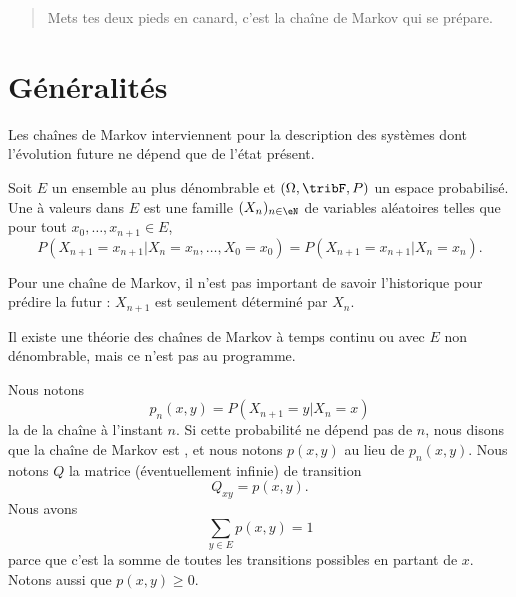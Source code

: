 
\begin{quote}
    Mets tes deux pieds en canard, c'est la chaîne de Markov qui se prépare.
\end{quote}

\section{Généralités}

Les chaînes de Markov interviennent pour la description des systèmes dont l'évolution future ne dépend que de l'état présent.

\begin{definition}
    Soit \( E\) un ensemble au plus dénombrable et \( (\Omega,\tribF,P)\) un espace probabilisé. Une  à valeurs dans \( E\) est une famille \( (X_n)_{n\in\eN}\) de variables aléatoires telles que pour tout \( x_0,\ldots,x_{n+1}\in E\),
    \begin{equation}
        P(X_{n+1}=x_{n+1}|X_n=x_n,\ldots,X_0=x_0)=P(X_{n+1}=x_{n+1}|X_n=x_n).
    \end{equation}
\end{definition}
Pour une chaîne de Markov, il n'est pas important de savoir l'historique pour prédire la futur : \( X_{n+1}\) est seulement déterminé par \( X_n\).

\begin{remark}
    Il existe une théorie des chaînes de Markov à temps continu ou avec \( E\) non dénombrable, mais ce n'est pas au programme.
\end{remark}

Nous notons
\begin{equation}
    p_n(x,y)=P(X_{n+1}=y|X_n=x)
\end{equation}
la  de la chaîne à l'instant \( n\). Si cette probabilité ne dépend pas de \( n\), nous disons que la chaîne de Markov est , et nous notons \( p(x,y)\) au lieu de \( p_n(x,y)\). Nous notons \( Q\) la matrice (éventuellement infinie) de transition
\begin{equation}
    Q_{xy}=p(x,y).
\end{equation}
Nous avons
\begin{equation}
    \sum_{y\in E}p(x,y)=1
\end{equation}
parce que c'est la somme de toutes les transitions possibles en partant de \( x\). Notons aussi que \( p(x,y)\geq 0\).



